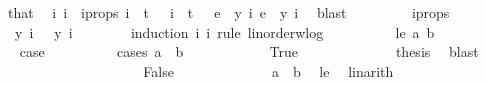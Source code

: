 \begin{isabellebody}
\ that\ \isamarkupfalse%
\ i{}\ i{}\ \ i{\isacharunderscore}{\kern0pt}props{\isacharcolon}{\kern0pt}\ {\isachardoublequoteopen}i{}\ {\isacharless}{\kern0pt}\ t\ {\isacharplus}{\kern0pt}\ {}{\isachardoublequoteclose}\ {\isachardoublequoteopen}i{}\ {\isacharless}{\kern0pt}\ t\ {\isacharplus}{\kern0pt}\ {}{\isachardoublequoteclose}\ {\isachardoublequoteopen}e{}\ {\isacharequal}{\kern0pt}\ y\ i{}{\isachardoublequoteclose}\ {\isachardoublequoteopen}e{}\ {\isacharequal}{\kern0pt}\ y\ i{}{\isachardoublequoteclose}\ \isamarkupfalse%
\ blast\ \isanewline
\ \ \ \ \ \ \isamarkupfalse%
\ i{\isacharunderscore}{\kern0pt}props{\isacharparenleft}{\kern0pt}{}{\isacharcomma}{\kern0pt}{}{\isacharparenright}{\kern0pt}\ \isamarkupfalse%
\ {\isachardoublequoteopen}{\isasymchi}\ {\isacharparenleft}{\kern0pt}y\ i{}{\isacharparenright}{\kern0pt}\ {\isacharequal}{\kern0pt}\ {\isasymchi}\ {\isacharparenleft}{\kern0pt}y\ i{}{\isacharparenright}{\kern0pt}{\isachardoublequoteclose}\isanewline
\ \ \ \ \ \ \isamarkupfalse%
\ {\isacharparenleft}{\kern0pt}induction\ i{}\ i{}\ rule{\isacharcolon}{\kern0pt}\ linorder{\isacharunderscore}{\kern0pt}wlog{\isacharparenright}{\kern0pt}\isanewline
\ \ \ \ \ \ \ \ \isamarkupfalse%
\ {\isacharparenleft}{\kern0pt}le\ a\ b{\isacharparenright}{\kern0pt}\isanewline
\ \ \ \ \ \ \ \ \isamarkupfalse%
\ \isamarkupfalse%
\ {\isacharquery}{\kern0pt}case\isanewline
\ \ \ \ \ \ \ \ \isamarkupfalse%
\ {\isacharparenleft}{\kern0pt}cases\ {\isachardoublequoteopen}a\ {\isacharequal}{\kern0pt}\ b{\isachardoublequoteclose}{\isacharparenright}{\kern0pt}\isanewline
\ \ \ \ \ \ \ \ \ \ \isamarkupfalse%
\ True\isanewline
\ \ \ \ \ \ \ \ \ \ \isamarkupfalse%
\ \isamarkupfalse%
\ {\isacharquery}{\kern0pt}thesis\ \isamarkupfalse%
\ blast\isanewline
\ \ \ \ \ \ \ \ \isamarkupfalse%
\isanewline
\ \ \ \ \ \ \ \ \ \ \isamarkupfalse%
\ False\isanewline
\ \ \ \ \ \ \ \ \ \ \isamarkupfalse%
\ \isamarkupfalse%
\ {\isachardoublequoteopen}a\ {\isacharless}{\kern0pt}\ b{\isachardoublequoteclose}\ \isamarkupfalse%
\ le\ \isamarkupfalse%
\ linarith\isanewline
\ \ \ \ \ \ \ \ \ \ \isamarkupfalse%

\end{isabellebody}
